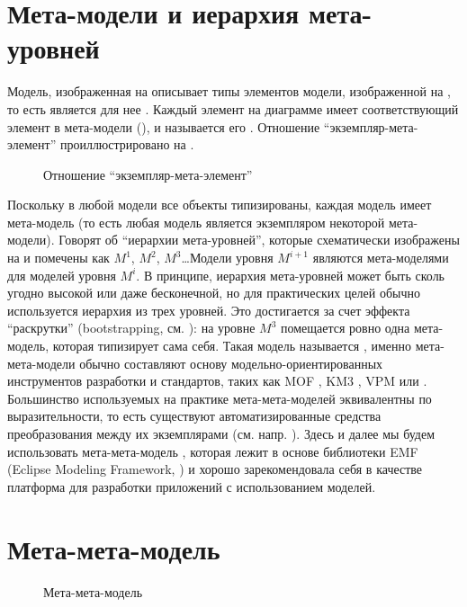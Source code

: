 \section{Мета-модели и иерархия мета-уровней}

Модель, изображенная на  описывает типы элементов модели, изображенной на , то есть является для нее . Каждый элемент на диаграмме  имеет соответствующий элемент в мета-модели (), и называется его . Отношение ``экземпляр-мета-элемент'' проиллюстрировано на .

\begin{figure}[htbp]
\caption{Отношение ``экземпляр-мета-элемент''}\label{ConformsToRelation}
\end{figure}

Поскольку в любой модели все объекты типизированы, каждая модель имеет мета-модель  (то есть любая модель является экземпляром некоторой мета-модели). Говорят об ``иерархии мета-уровней'', которые схематически изображены на   и помечены как $M^1$, $M^2$, $M^3$\ldots Модели уровня $M^{i+1}$ являются мета-моделями для моделей уровня $M^i$. В принципе, иерархия мета-уровней может быть сколь угодно высокой или даже бесконечной, но для практических целей обычно используется иерархия из трех уровней. Это достигается за счет эффекта ``раскрутки'' (bootstrapping, см. \cite{Wirth}): на уровне $M^3$ помещается ровно одна мета-модель, которая типизирует сама себя. Такая модель называется , именно мета-мета-модели обычно составляют основу модельно-ориентированных инструментов разработки и стандартов, таких как MOF \cite{MOF}, KM3 \cite{KM3}, VPM \cite{VPM} или  \cite{EMF}. Большинство используемых на практике мета-мета-моделей эквивалентны по выразительности, то есть существуют автоматизированные средства преобразования между их экземплярами (см. напр. \cite{KM3}). Здесь и далее мы будем использовать мета-мета-модель , которая лежит в основе библиотеки EMF (Eclipse Modeling Framework, \cite{EMF}) и хорошо зарекомендовала себя в качестве платформа для разработки приложений с использованием моделей.

\section{Мета-мета-модель }

\begin{figure}[htbp]
\caption{Мета-мета-модель }\label{Ecore}
\end{figure}

